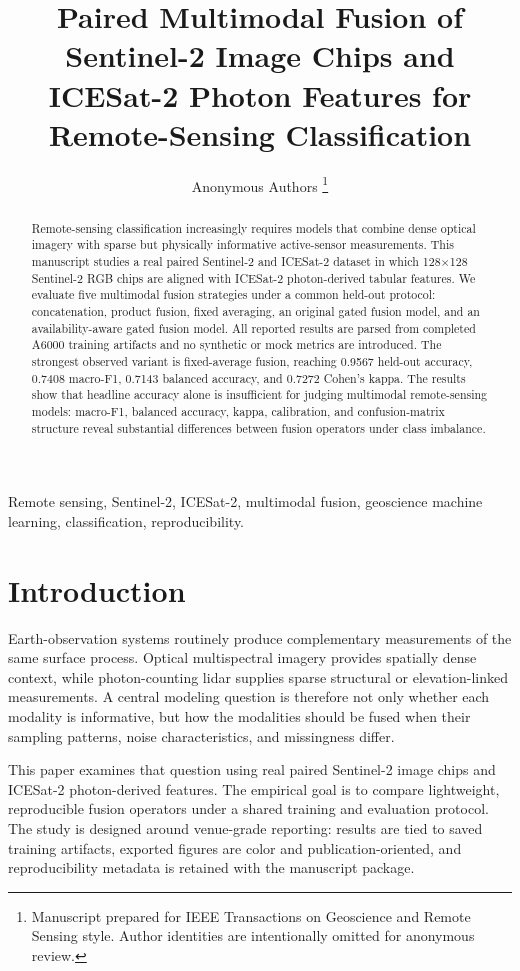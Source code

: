 \documentclass[journal]{IEEEtran}
\title{Paired Multimodal Fusion of Sentinel-2 Image Chips and ICESat-2 Photon Features for Remote-Sensing Classification}
\author{Anonymous Authors%
\thanks{Manuscript prepared for IEEE Transactions on Geoscience and Remote Sensing style. Author identities are intentionally omitted for anonymous review.}}
\begin{document}
\maketitle

\begin{abstract}
Remote-sensing classification increasingly requires models that combine dense optical imagery with sparse but physically informative active-sensor measurements. This manuscript studies a real paired Sentinel-2 and ICESat-2 dataset in which 128$\times$128 Sentinel-2 RGB chips are aligned with ICESat-2 photon-derived tabular features. We evaluate five multimodal fusion strategies under a common held-out protocol: concatenation, product fusion, fixed averaging, an original gated fusion model, and an availability-aware gated fusion model. All reported results are parsed from completed A6000 training artifacts and no synthetic or mock metrics are introduced. The strongest observed variant is fixed-average fusion, reaching 0.9567 held-out accuracy, 0.7408 macro-F1, 0.7143 balanced accuracy, and 0.7272 Cohen's kappa. The results show that headline accuracy alone is insufficient for judging multimodal remote-sensing models: macro-F1, balanced accuracy, kappa, calibration, and confusion-matrix structure reveal substantial differences between fusion operators under class imbalance.
\end{abstract}

\begin{IEEEkeywords}
Remote sensing, Sentinel-2, ICESat-2, multimodal fusion, geoscience machine learning, classification, reproducibility.
\end{IEEEkeywords}

\section{Introduction}
Earth-observation systems routinely produce complementary measurements of the same surface process. Optical multispectral imagery provides spatially dense context, while photon-counting lidar supplies sparse structural or elevation-linked measurements. A central modeling question is therefore not only whether each modality is informative, but how the modalities should be fused when their sampling patterns, noise characteristics, and missingness differ.

This paper examines that question using real paired Sentinel-2 image chips and ICESat-2 photon-derived features. The empirical goal is to compare lightweight, reproducible fusion operators under a shared training and evaluation protocol. The study is designed around venue-grade reporting: results are tied to saved training artifacts, exported figures are color and publication-oriented, and reproducibility metadata is retained with the manuscript package.
\end{document}
